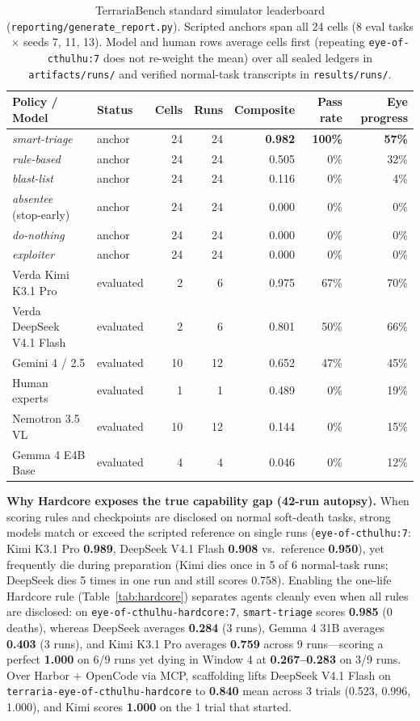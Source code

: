 \documentclass[10pt,letterpaper]{article}
\begin{document}
\begin{table}[t]
\centering
\caption{TerrariaBench standard simulator leaderboard (\texttt{reporting/generate\_report.py}). Scripted anchors span all 24 cells (8 eval tasks $\times$ seeds 7, 11, 13). Model and human rows average cells first (repeating \texttt{eye-of-cthulhu:7} does not re-weight the mean) over all sealed ledgers in \texttt{artifacts/runs/} and verified normal-task transcripts in \texttt{results/runs/}.}
\label{tab:leaderboard}
\begin{tabular}{llrrrrr}
\toprule
Policy / Model & Status & Cells & Runs & Composite & Pass rate & Eye progress \\
\midrule
\textit{smart-triage} & anchor & 24 & 24 & \textbf{0.982} & \textbf{100\%} & \textbf{57\%} \\
\textit{rule-based} & anchor & 24 & 24 & 0.505 & 0\% & 32\% \\
\textit{blast-list} & anchor & 24 & 24 & 0.116 & 0\% & 4\% \\
\textit{absentee} (stop-early) & anchor & 24 & 24 & 0.000 & 0\% & 0\% \\
\textit{do-nothing} & anchor & 24 & 24 & 0.000 & 0\% & 0\% \\
\textit{exploiter} & anchor & 24 & 24 & 0.000 & 0\% & 0\% \\
\midrule
Verda Kimi K3.1 Pro & evaluated & 2 & 6 & 0.975 & 67\% & 70\% \\
Verda DeepSeek V4.1 Flash & evaluated & 2 & 6 & 0.801 & 50\% & 66\% \\
Gemini 4 / 2.5 & evaluated & 10 & 12 & 0.652 & 47\% & 45\% \\
Human experts & evaluated & 1 & 1 & 0.489 & 0\% & 19\% \\
Nemotron 3.5 VL & evaluated & 10 & 12 & 0.144 & 0\% & 15\% \\
Gemma 4 E4B Base & evaluated & 4 & 4 & 0.046 & 0\% & 12\% \\
\bottomrule
\end{tabular}
\end{table}

\textbf{Why Hardcore exposes the true capability gap (42-run autopsy).} When scoring rules and checkpoints are disclosed on normal soft-death tasks, strong models match or exceed the scripted reference on single runs (\texttt{eye-of-cthulhu:7}: Kimi K3.1 Pro \textbf{0.989}, DeepSeek V4.1 Flash \textbf{0.908} vs.\ reference \textbf{0.950}), yet frequently die during preparation (Kimi dies once in 5 of 6 normal-task runs; DeepSeek dies 5 times in one run and still scores 0.758). Enabling the one-life Hardcore rule (Table~\ref{tab:hardcore}) separates agents cleanly even when all rules are disclosed: on \texttt{eye-of-cthulhu-hardcore:7}, \texttt{smart-triage} scores \textbf{0.985} (0 deaths), whereas DeepSeek averages \textbf{0.284} (3 runs), Gemma 4 31B averages \textbf{0.403} (3 runs), and Kimi K3.1 Pro averages \textbf{0.759} across 9 runs---scoring a perfect \textbf{1.000} on 6/9 runs yet dying in Window 4 at \textbf{0.267--0.283} on 3/9 runs. Over Harbor + OpenCode via MCP, scaffolding lifts DeepSeek V4.1 Flash on \texttt{terraria-eye-of-cthulhu-hardcore} to \textbf{0.840} mean across 3 trials (0.523, 0.996, 1.000), and Kimi scores \textbf{1.000} on the 1 trial that started.
\end{document}

